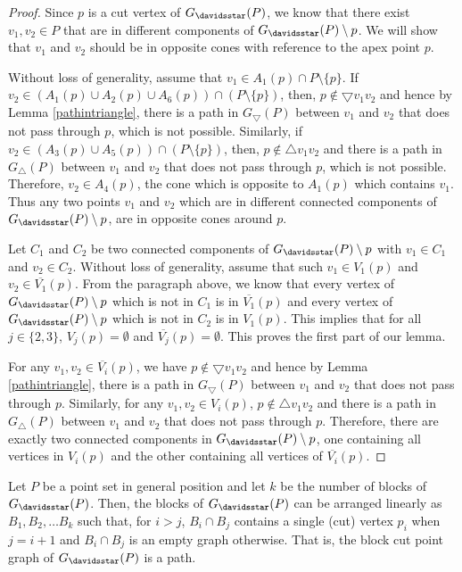 \begin{proof}
Since $p$ is a cut vertex of $G_{\davidsstar}(P)$, we know that there exist $v_1, v_2 \in P$ that are in different components of 
$G_{\davidsstar}(P) \setminus p$. We will show that $v_1$ and $v_2$ should be in opposite cones with reference to the apex point $p$.

Without loss of generality, assume that $v_1 \in A_1(p) \cap P \setminus \{p\}$. If $v_2 \in ( A_1(p) \cup A_2(p) \cup A_6(p)) \cap (P \setminus \{p\})$, then, $p \notin \bigtriangledown v_1 v_2$ and hence by Lemma \ref{pathintriangle}, there is a path in $G_{\bigtriangledown}(P)$ 
between $v_1$ and $v_2$ that does not pass through $p$, which is not possible. Similarly, if $v_2 \in (A_3(p) \cup A_5(p)) \cap (P \setminus \{p\})$, 
then, $p \notin \bigtriangleup v_1 v_2$ and there is a path in $G_{\bigtriangleup}(P)$ between $v_1$ and $v_2$ that does not pass through $p$, which 
is not possible. Therefore, $v_2 \in A_4(p)$, the cone which is opposite to $A_1(p)$ which contains $v_1$. Thus any two points $v_1$ and $v_2$ which 
are in different connected components of $G_{\davidsstar}(P) \setminus p$, are in opposite cones around $p$. 

Let $C_1$ and $C_2$ be two connected components of $G_{\davidsstar}(P) \setminus p$ with $v_1 \in C_1$ and $v_2 \in C_2$. Without loss of generality, 
assume that such $v_1 \in {V_1}(p)$ and $v_2 \in \overline{V_1}(p)$. From the paragraph above, we know that every vertex of $G_{\davidsstar}(P) \setminus p$ which is not in $C_1$ is in $\overline{V_1}(p)$ and every vertex of $G_{\davidsstar}(P) \setminus p$ which is not in $C_2$ is in ${V_1}(p)$. 
This implies that for all $j \in \{2, 3\}$, ${V_j}(p) = \emptyset$ and $\overline{V_j}(p) = \emptyset$. This proves the first part of our lemma. 

For any $v_1, v_2 \in \overline{V_i}(p)$, we have $p \notin \bigtriangledown v_1 v_2$ and hence by Lemma \ref{pathintriangle}, there is a path in $G_{\bigtriangledown}(P)$ between $v_1$ and $v_2$ that does not pass through $p$. Similarly, for any $v_1, v_2 \in V_i(p)$, $p \notin \bigtriangleup v_1 v_2$ 
and there is a path in $G_{\bigtriangleup}(P)$ between $v_1$ and $v_2$ that does not pass through $p$. Therefore, there are exactly two connected components 
in $G_{\davidsstar}(P) \setminus p$, one containing all vertices in $V_i(p)$ and the other containing all vertices of $\overline{V_i}(p)$.
\end{proof}
\begin{theorem}\label{blocks}
Let $P$ be a point set in general position and let $k$ be the number of blocks of $G_{\davidsstar}(P)$. Then, the blocks of $G_{\davidsstar}(P)$ can 
be arranged linearly as $B_1,B_2, \ldots B_k$ such that, for $i > j$, $B_i \cap B_{j}$ contains a single (cut) vertex $p_i$ when $j = i+1$ and 
$B_i \cap B_{j}$ is an empty graph otherwise. That is, the block cut point graph of $G_{\davidsstar}(P)$ is a path. 
\end{theorem}
